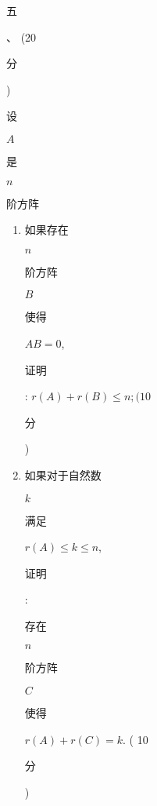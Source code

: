 \documentclass[10pt]{article}
\begin{document}
\begin{CJK}{UTF8}{mj}五\end{CJK}、 (20 \begin{CJK}{UTF8}{mj}分\end{CJK}) \begin{CJK}{UTF8}{mj}设\end{CJK} $A$ \begin{CJK}{UTF8}{mj}是\end{CJK} $n$ \begin{CJK}{UTF8}{mj}阶方阵\end{CJK}

\begin{enumerate}
  \item \begin{CJK}{UTF8}{mj}如果存在\end{CJK} $n$ \begin{CJK}{UTF8}{mj}阶方阵\end{CJK} $B$ \begin{CJK}{UTF8}{mj}使得\end{CJK} $A B=0$, \begin{CJK}{UTF8}{mj}证明\end{CJK}: $r(A)+r(B) \leqslant n ;(10$ \begin{CJK}{UTF8}{mj}分\end{CJK})

  \item \begin{CJK}{UTF8}{mj}如果对于自然数\end{CJK} $k$ \begin{CJK}{UTF8}{mj}满足\end{CJK} $r(A) \leqslant k \leqslant n$, \begin{CJK}{UTF8}{mj}证明\end{CJK}: \begin{CJK}{UTF8}{mj}存在\end{CJK} $n$ \begin{CJK}{UTF8}{mj}阶方阵\end{CJK} $C$ \begin{CJK}{UTF8}{mj}使得\end{CJK} $r(A)+r(C)=k$. ( 10 \begin{CJK}{UTF8}{mj}分\end{CJK})

\end{enumerate}
\end{document}
